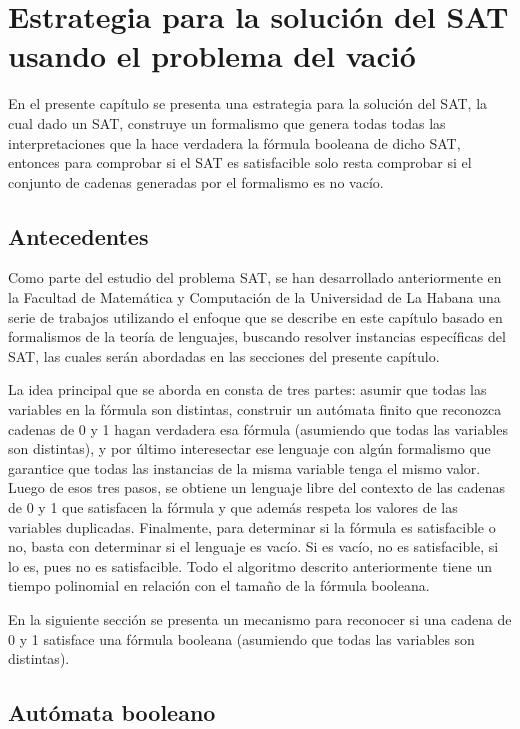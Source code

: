 \chapter{Estrategia para la solución del SAT usando el problema del vació}

En el presente capítulo se presenta una estrategia para la solución del SAT, la cual dado un SAT,
construye un formalismo que genera todas todas las interpretaciones que la hace verdadera la fórmula
booleana de dicho SAT, entonces para comprobar si el SAT es satisfacible solo resta comprobar si
el conjunto de cadenas generadas por el formalismo es no vacío.

\section{Antecedentes}

Como parte del estudio del problema SAT, se han desarrollado anteriormente en
la Facultad de Matemática y Computación de la Universidad de La Habana
una serie de trabajos utilizando el enfoque que se describe en este capítulo
basado en formalismos de la teoría de lenguajes, buscando resolver
instancias específicas del SAT, las cuales serán abordadas en las secciones del
presente capítulo.

La idea principal que se aborda en \cite{aCFSAT} consta de tres partes: asumir que todas las variables en
la fórmula son distintas, construir un autómata finito que reconozca cadenas de 0 y 1 hagan verdadera esa
fórmula (asumiendo que todas las variables son distintas), y por último interesectar ese lenguaje con algún
formalismo que garantice que todas las instancias de la misma variable tenga el mismo valor. Luego de esos
tres pasos, se obtiene un lenguaje libre del contexto de las cadenas de 0 y 1 que satisfacen la fórmula y
que además respeta los valores de las variables duplicadas.  Finalmente, para determinar si la fórmula es
satisfacible o no, basta con determinar si el lenguaje es vacío. Si es vacío, no es satisfacible, si lo es,
pues no es satisfacible. Todo el algoritmo descrito anteriormente tiene un tiempo polinomial en relación con el
tamaño de la fórmula booleana.

En la siguiente sección se presenta un mecanismo para reconocer si una cadena de 0 y 1 satisface una fórmula booleana
(asumiendo que todas las variables son distintas).

\section{Autómata booleano}

